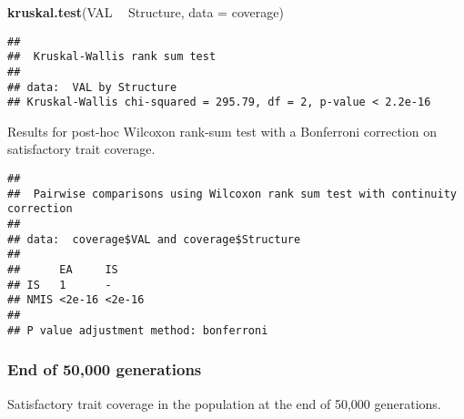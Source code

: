 \documentclass[]{book}
\newenvironment{Shaded}{\begin{snugshade}}{\end{snugshade}}
\newcommand{\DataTypeTok}[1]{\textcolor[rgb]{0.13,0.29,0.53}{#1}}
\newcommand{\KeywordTok}[1]{\textcolor[rgb]{0.13,0.29,0.53}{\textbf{#1}}}
\newcommand{\NormalTok}[1]{#1}
\newcommand{\OperatorTok}[1]{\textcolor[rgb]{0.81,0.36,0.00}{\textbf{#1}}}
\newcommand{\OtherTok}[1]{\textcolor[rgb]{0.56,0.35,0.01}{#1}}
\newcommand{\StringTok}[1]{\textcolor[rgb]{0.31,0.60,0.02}{#1}}
\begin{document}
\begin{Shaded}
\begin{Highlighting}[]
\KeywordTok{kruskal.test}\NormalTok{(VAL }\OperatorTok{~}\StringTok{ }\NormalTok{Structure, }\DataTypeTok{data =}\NormalTok{ coverage)}
\end{Highlighting}
\end{Shaded}

\begin{verbatim}
## 
##  Kruskal-Wallis rank sum test
## 
## data:  VAL by Structure
## Kruskal-Wallis chi-squared = 295.79, df = 2, p-value < 2.2e-16
\end{verbatim}

Results for post-hoc Wilcoxon rank-sum test with a Bonferroni correction on satisfactory trait coverage.

\begin{Shaded}
\end{Shaded}

\begin{verbatim}
## 
##  Pairwise comparisons using Wilcoxon rank sum test with continuity correction 
## 
## data:  coverage$VAL and coverage$Structure 
## 
##      EA     IS    
## IS   1      -     
## NMIS <2e-16 <2e-16
## 
## P value adjustment method: bonferroni
\end{verbatim}

\hypertarget{end-of-50000-generations-11}{%
\subsubsection{End of 50,000 generations}\label{end-of-50000-generations-11}}

Satisfactory trait coverage in the population at the end of 50,000 generations.
\end{document}
